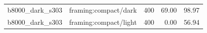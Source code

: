 \begin{longtable}{l>{\raggedright\arraybackslash}p{.42\linewidth}rrr}
b8000\_\allowbreak{}dark\_\allowbreak{}s303 & %
framing:compact/dark & %
400 & %
69.00 & %
98.97 \\ %

b8000\_\allowbreak{}dark\_\allowbreak{}s303 & %
framing:compact/light & %
400 & %
0.00 & %
56.94 \\ %


\end{longtable}
